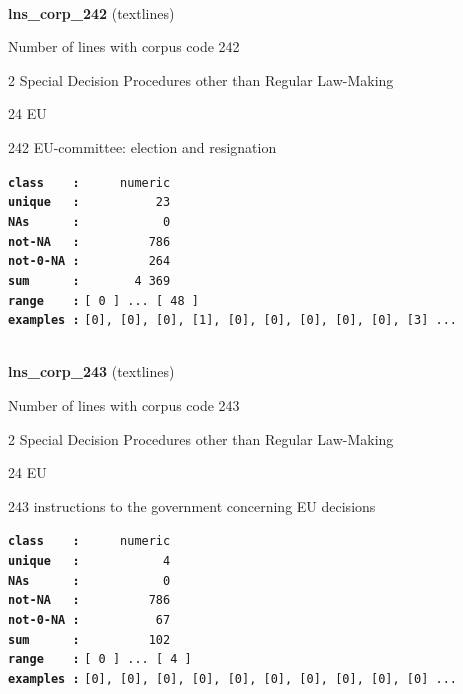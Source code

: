 \documentclass[]{article}
\begin{document}
~

\textbf{lns\_corp\_242} (textlines)

Number of lines with corpus code 242

2 Special Decision Procedures other than Regular Law-Making

24 EU

242 EU-committee: election and resignation

\textbf{\texttt{class\ \ \ \ :}} \texttt{~~~~~numeric}\\
\textbf{\texttt{unique\ \ \ :}} \texttt{~~~~~~~~~~23}\\
\textbf{\texttt{NAs\ \ \ \ \ \ :}} \texttt{~~~~~~~~~~~0}\\
\textbf{\texttt{not-NA\ \ \ :}} \texttt{~~~~~~~~~786}\\
\textbf{\texttt{not-0-NA\ :}} \texttt{~~~~~~~~~264}\\
\textbf{\texttt{sum\ \ \ \ \ \ :}} \texttt{~~~~~~~4~369}\\
\textbf{\texttt{range\ \ \ \ :}}
\texttt{{[}\ 0\ {]}\ ...\ {[}\ 48\ {]}}\\
\textbf{\texttt{examples\ :}}
\texttt{{[}0{]},\ {[}0{]},\ {[}0{]},\ {[}1{]},\ {[}0{]},\ {[}0{]},\ {[}0{]},\ {[}0{]},\ {[}0{]},\ {[}3{]}\ ...}\\

~

\textbf{lns\_corp\_243} (textlines)

Number of lines with corpus code 243

2 Special Decision Procedures other than Regular Law-Making

24 EU

243 instructions to the government concerning EU decisions

\textbf{\texttt{class\ \ \ \ :}} \texttt{~~~~~numeric}\\
\textbf{\texttt{unique\ \ \ :}} \texttt{~~~~~~~~~~~4}\\
\textbf{\texttt{NAs\ \ \ \ \ \ :}} \texttt{~~~~~~~~~~~0}\\
\textbf{\texttt{not-NA\ \ \ :}} \texttt{~~~~~~~~~786}\\
\textbf{\texttt{not-0-NA\ :}} \texttt{~~~~~~~~~~67}\\
\textbf{\texttt{sum\ \ \ \ \ \ :}} \texttt{~~~~~~~~~102}\\
\textbf{\texttt{range\ \ \ \ :}}
\texttt{{[}\ 0\ {]}\ ...\ {[}\ 4\ {]}}\\
\textbf{\texttt{examples\ :}}
\texttt{{[}0{]},\ {[}0{]},\ {[}0{]},\ {[}0{]},\ {[}0{]},\ {[}0{]},\ {[}0{]},\ {[}0{]},\ {[}0{]},\ {[}0{]}\ ...}\\
\end{document}
